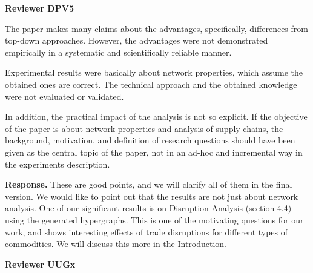 
\onecolumn

\noindent
\textbf{Reviewer DPV5}

\color{blue}
The paper makes many claims about the advantages, specifically, differences from top-down approaches. However, the advantages were not demonstrated empirically in a systematic and scientifically reliable manner.

Experimental results were basically about network properties, which assume the obtained ones are correct. The technical approach and the obtained knowledge were not evaluated or validated.

In addition, the practical impact of the analysis is not so explicit. If the objective of the paper is about network properties and analysis of supply chains, the background, motivation, and definition of research questions should have been given as the central topic of the paper, not in an ad-hoc and incremental way in the experiments description.
\color{black}

\textbf{Response.}
These are good points, and we will clarify all of them in the final version.
We would like to point out that the results are not just about network analysis.
One of our significant results is on Disruption Analysis (section 4.4) using the generated hypergraphs.
This is one of the motivating questions for our work, and shows interesting effects of trade disruptions for different types of commodities.
We will discuss this more in the Introduction.

\noindent
\textbf{Reviewer UUGx}

\color{blue}

